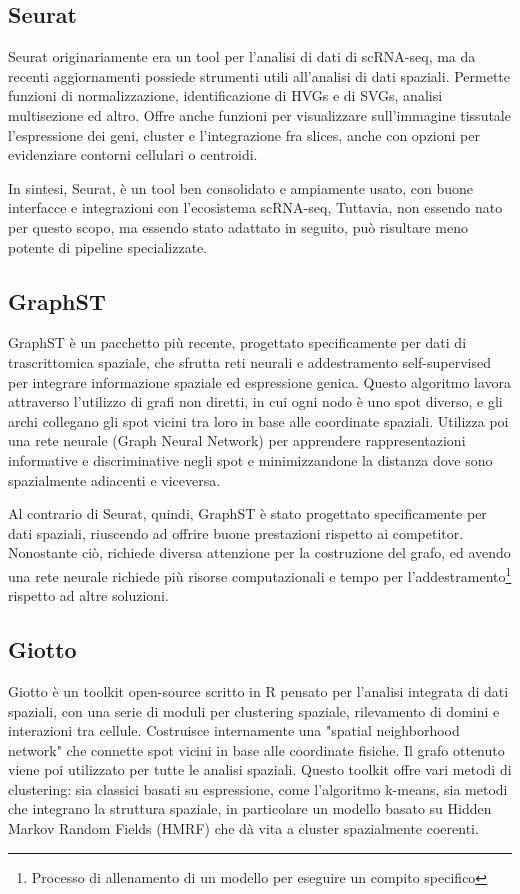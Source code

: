 \subsection{Seurat}\label{subsec:seurat}
Seurat originariamente era un tool per l'analisi di dati di scRNA-seq, ma da recenti aggiornamenti possiede strumenti utili all'analisi di dati spaziali.
Permette funzioni di normalizzazione, identificazione di HVGs e di SVGs, analisi multisezione ed altro.
Offre anche funzioni per visualizzare sull'immagine tissutale l'espressione dei geni, cluster e l'integrazione fra slices, anche con opzioni per evidenziare contorni cellulari o centroidi.

In sintesi, Seurat, è un tool ben consolidato e ampiamente usato, con buone interfacce e integrazioni con l'ecosistema scRNA-seq,
Tuttavia, non essendo nato per questo scopo, ma essendo stato adattato in seguito, può risultare meno potente di pipeline specializzate.

\subsection{GraphST}\label{subsec:graphst}
GraphST è un pacchetto più recente, progettato specificamente per dati di trascrittomica spaziale, 
che sfrutta reti neurali e addestramento self-supervised per integrare informazione spaziale ed espressione genica.
Questo algoritmo lavora attraverso l'utilizzo di grafi non diretti, in cui ogni nodo è uno spot diverso, e gli archi collegano gli spot vicini tra loro in base alle coordinate spaziali.
Utilizza poi una rete neurale (Graph Neural Network) per apprendere rappresentazioni informative e discriminative negli spot e minimizzandone la distanza dove sono spazialmente adiacenti e viceversa.

Al contrario di Seurat, quindi, GraphST è stato progettato specificamente per dati spaziali, riuscendo ad offrire buone prestazioni rispetto ai competitor.
Nonostante ciò, richiede diversa attenzione per la costruzione del grafo, ed avendo una rete neurale richiede più risorse computazionali e tempo per l'addestramento\footnote{Processo di allenamento di un modello per eseguire un compito specifico} rispetto ad altre soluzioni.

\subsection{Giotto}\label{subsec:giotto}
Giotto è un toolkit open-source scritto in R pensato per 
l'analisi integrata di dati spaziali, con una serie di moduli 
per clustering spaziale, rilevamento di domini e interazioni tra cellule.
Costruisce internamente una "spatial neighborhood network" 
che connette spot vicini in base alle coordinate fisiche. 
Il grafo ottenuto viene poi utilizzato per tutte le analisi spaziali.
Questo toolkit offre vari metodi di clustering: sia classici 
basati su espressione, come l'algoritmo k-means, 
sia metodi che integrano la struttura spaziale, 
in particolare un modello basato su 
Hidden Markov Random Fields (HMRF) che dà vita a cluster spazialmente coerenti.


